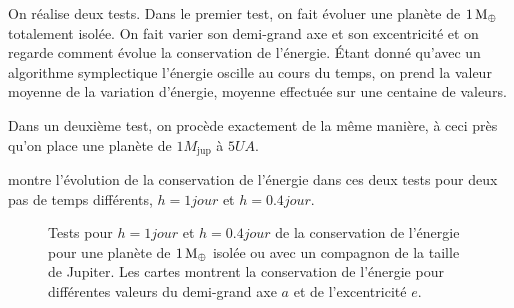 On réalise deux tests. Dans le premier test, on fait évoluer une planète de $1\mathrm{\thinspace M_\oplus}$ totalement isolée. On fait varier son demi-grand axe et son excentricité et on regarde comment évolue la conservation de l'énergie. Étant donné qu'avec un algorithme symplectique l'énergie oscille au cours du temps, on prend la valeur moyenne de la variation d'énergie, moyenne effectuée sur une centaine de valeurs.

Dans un deuxième test, on procède exactement de la même manière, à ceci près qu'on place une planète de $1\unit{M_\text{jup}}$ à $5\unit{UA}$. 

 montre l'évolution de la conservation de l'énergie dans ces deux tests pour deux pas de temps différents, $h=1\unit{jour}$ et $h=0.4\unit{jour}$.

\begin{figure}[htb]
\centering
{}\hfill
{}

\hfill
{}


\caption{Tests pour $h=1\unit{jour}$ et $h=0.4\unit{jour}$ de la conservation de l'énergie pour une planète de $1\mathrm{\thinspace M_\oplus}$ isolée ou avec un compagnon de la taille de Jupiter. Les cartes montrent la conservation de l'énergie pour différentes valeurs du demi-grand axe $a$ et de l'excentricité $e$.}\label{fig:accuracy_maps}
\end{figure}

